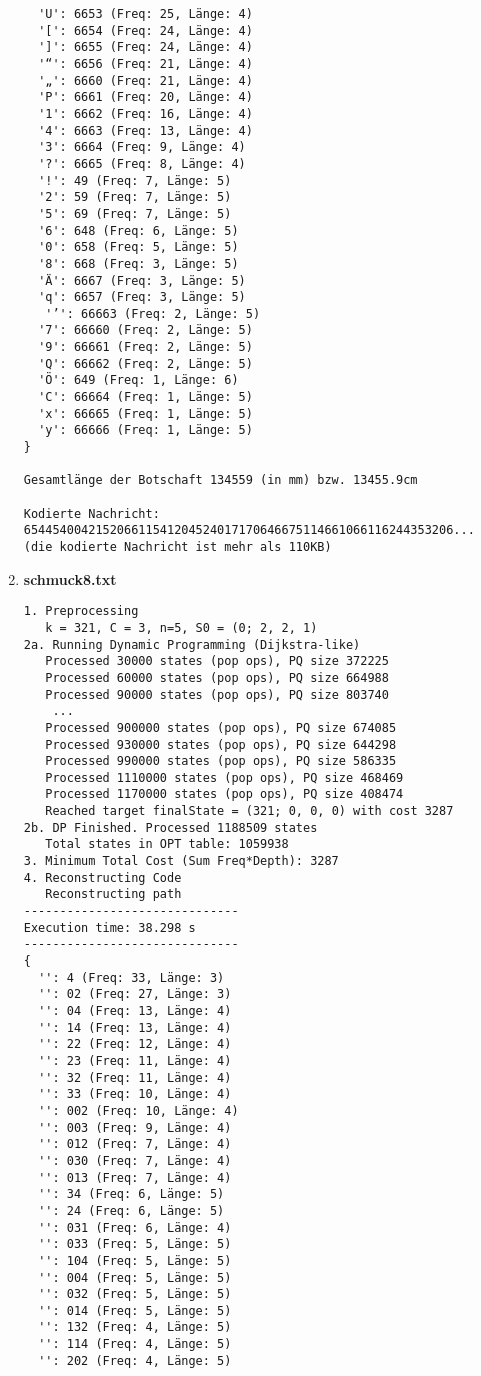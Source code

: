 \documentclass[a4paper,10pt,ngerman]{scrartcl}
\begin{document}
\begin{enumerate}
\begin{verbatim}
  'U': 6653 (Freq: 25, Länge: 4)
  '[': 6654 (Freq: 24, Länge: 4)
  ']': 6655 (Freq: 24, Länge: 4)
  '“': 6656 (Freq: 21, Länge: 4)
  '„': 6660 (Freq: 21, Länge: 4)
  'P': 6661 (Freq: 20, Länge: 4)
  '1': 6662 (Freq: 16, Länge: 4)
  '4': 6663 (Freq: 13, Länge: 4)
  '3': 6664 (Freq: 9, Länge: 4)
  '?': 6665 (Freq: 8, Länge: 4)
  '!': 49 (Freq: 7, Länge: 5)
  '2': 59 (Freq: 7, Länge: 5)
  '5': 69 (Freq: 7, Länge: 5)
  '6': 648 (Freq: 6, Länge: 5)
  '0': 658 (Freq: 5, Länge: 5)
  '8': 668 (Freq: 3, Länge: 5)
  'Ä': 6667 (Freq: 3, Länge: 5)
  'q': 6657 (Freq: 3, Länge: 5)
   '’': 66663 (Freq: 2, Länge: 5)
  '7': 66660 (Freq: 2, Länge: 5)
  '9': 66661 (Freq: 2, Länge: 5)
  'Q': 66662 (Freq: 2, Länge: 5)
  'Ö': 649 (Freq: 1, Länge: 6)
  'C': 66664 (Freq: 1, Länge: 5)
  'x': 66665 (Freq: 1, Länge: 5)
  'y': 66666 (Freq: 1, Länge: 5)
}

Gesamtlänge der Botschaft 134559 (in mm) bzw. 13455.9cm

Kodierte Nachricht: 654454004215206611541204524017170646675114661066116244353206... (die kodierte Nachricht ist mehr als 110KB)
\end{verbatim}

\item \textbf{schmuck8.txt}
\begin{verbatim}
1. Preprocessing
   k = 321, C = 3, n=5, S0 = (0; 2, 2, 1)
2a. Running Dynamic Programming (Dijkstra-like)
   Processed 30000 states (pop ops), PQ size 372225
   Processed 60000 states (pop ops), PQ size 664988
   Processed 90000 states (pop ops), PQ size 803740
    ... 
   Processed 900000 states (pop ops), PQ size 674085
   Processed 930000 states (pop ops), PQ size 644298
   Processed 990000 states (pop ops), PQ size 586335
   Processed 1110000 states (pop ops), PQ size 468469
   Processed 1170000 states (pop ops), PQ size 408474
   Reached target finalState = (321; 0, 0, 0) with cost 3287
2b. DP Finished. Processed 1188509 states
   Total states in OPT table: 1059938
3. Minimum Total Cost (Sum Freq*Depth): 3287
4. Reconstructing Code
   Reconstructing path
------------------------------
Execution time: 38.298 s
------------------------------
{
  '': 4 (Freq: 33, Länge: 3)
  '': 02 (Freq: 27, Länge: 3)
  '': 04 (Freq: 13, Länge: 4)
  '': 14 (Freq: 13, Länge: 4)
  '': 22 (Freq: 12, Länge: 4)
  '': 23 (Freq: 11, Länge: 4)
  '': 32 (Freq: 11, Länge: 4)
  '': 33 (Freq: 10, Länge: 4)
  '': 002 (Freq: 10, Länge: 4)
  '': 003 (Freq: 9, Länge: 4)
  '': 012 (Freq: 7, Länge: 4)
  '': 030 (Freq: 7, Länge: 4)
  '': 013 (Freq: 7, Länge: 4)
  '': 34 (Freq: 6, Länge: 5)
  '': 24 (Freq: 6, Länge: 5)
  '': 031 (Freq: 6, Länge: 4)
  '': 033 (Freq: 5, Länge: 5)
  '': 104 (Freq: 5, Länge: 5)
  '': 004 (Freq: 5, Länge: 5)
  '': 032 (Freq: 5, Länge: 5)
  '': 014 (Freq: 5, Länge: 5)
  '': 132 (Freq: 4, Länge: 5)
  '': 114 (Freq: 4, Länge: 5)
  '': 202 (Freq: 4, Länge: 5)


\end{verbatim}
\end{enumerate}
\end{document}
